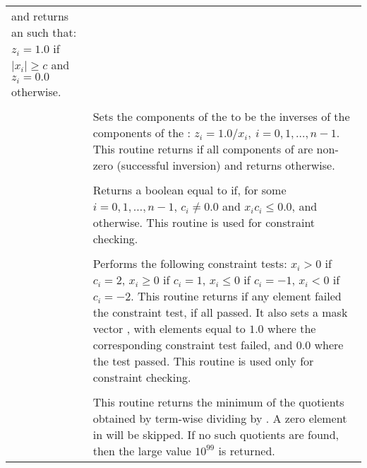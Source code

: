 \begin{supertabular}{|p{\colone}|p{\coltwo}|}
 and returns an   such that:
$z_i = 1.0$ if $| x_i | \ge c$ and $z_i = 0.0$ otherwise.
\\
%
 &  \\
& Sets the components of the   to be the inverses
of the components of the  :
$z_i = 1.0 /  x_i  , \: i=0,1,\ldots,n-1$.
This routine returns  if all components of  are
non-zero (successful inversion) and returns  otherwise.  
\\
%
 &  \\
& Returns a boolean equal to  if, for some
$i=0,1,\ldots,n-1$, 
$c_i \ne 0.0$ and $x_i c_i \le 0.0$, and  otherwise.
This routine is used for constraint checking.
\\
%
 &  \\
& Performs the following constraint tests:
$x_i > 0$ if $c_i=2$,
$x_i \ge 0$ if $c_i=1$,
$x_i \le 0$ if $c_i=-1$,
$x_i < 0$ if $c_i=-2$.
This routine returns  if any element failed
the constraint test,  if all passed.  It also sets a
mask vector , with elements equal to $1.0$ where the
corresponding constraint test failed, and $0.0$
where the test passed.
This routine is used only for constraint checking.
\\
%
 &  \\
& This routine returns the minimum of the quotients obtained   
by term-wise dividing  by . 
A zero element in  will be skipped. 
If no such quotients are found, then the large value $10^{99}$ is returned. 
\\
%
\end{supertabular}
\bigskip

